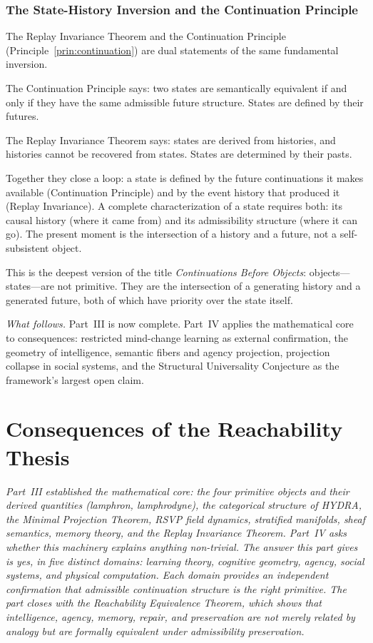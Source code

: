 \documentclass[12pt, oneside]{book}
\theoremstyle{flyxion}
\theoremstyle{definition}
\begin{document}
\section{The State-History Inversion and the Continuation
Principle}

The Replay Invariance Theorem and the Continuation
Principle (Principle~\ref{prin:continuation}) are dual
statements of the same fundamental inversion.

The Continuation Principle says: two states are
semantically equivalent if and only if they have the
same admissible future structure. States are defined
by their futures.

The Replay Invariance Theorem says: states are derived
from histories, and histories cannot be recovered from
states. States are determined by their pasts.

Together they close a loop: a state is defined by the
future continuations it makes available (Continuation
Principle) and by the event history that produced it
(Replay Invariance). A complete characterization of a
state requires both: its causal history (where it came
from) and its admissibility structure (where it can go).
The present moment is the intersection of a history and
a future, not a self-subsistent object.

This is the deepest version of the title \emph{Continuations
Before Objects}: objects---states---are not primitive.
They are the intersection of a generating history and a
generated future, both of which have priority over the
state itself.

\bigskip
\noindent\emph{What follows.} Part~III is now complete.
Part~IV applies the mathematical core to consequences:
restricted mind-change learning as external confirmation,
the geometry of intelligence, semantic fibers and agency
projection, projection collapse in social systems, and the
Structural Universality Conjecture as the framework's
largest open claim.




\part{Consequences of the Reachability Thesis}

\noindent\textit{Part~III established the mathematical
core: the four primitive objects and their derived
quantities (lamphron, lamphrodyne), the categorical
structure of HYDRA, the Minimal Projection Theorem,
RSVP field dynamics, stratified manifolds, sheaf
semantics, memory theory, and the Replay Invariance
Theorem. Part~IV asks whether this machinery explains
anything non-trivial. The answer this part gives is
yes, in five distinct domains: learning theory,
cognitive geometry, agency, social systems, and
physical computation. Each domain provides an
independent confirmation that admissible continuation
structure is the right primitive. The part closes
with the Reachability Equivalence Theorem, which
shows that intelligence, agency, memory, repair,
and preservation are not merely related by analogy
but are formally equivalent under admissibility
preservation.}
\end{document}
